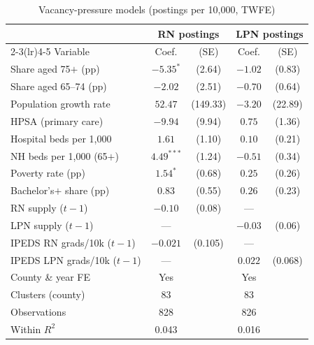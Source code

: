 \begin{table}[!htbp]
\centering
\caption{Vacancy-pressure models (postings per 10{,}000, TWFE)}
\label{tab:vacancy}
\small
\begin{tabular}{lcccc}
\toprule
 & \multicolumn{2}{c}{RN postings} & \multicolumn{2}{c}{LPN postings} \\
\cmidrule(lr){2-3}\cmidrule(lr){4-5}
Variable & Coef. & (SE) & Coef. & (SE) \\
\midrule
Share aged 75$+$ (pp) & $-5.35^{*}$ & (2.64) & $-1.02$ & (0.83) \\
Share aged 65--74 (pp) & $-2.02$ & (2.51) & $-0.70$ & (0.64) \\
Population growth rate & $52.47$ & (149.33) & $-3.20$ & (22.89) \\
HPSA (primary care) & $-9.94$ & (9.94) & $0.75$ & (1.36) \\
Hospital beds per 1{,}000 & $1.61$ & (1.10) & $0.10$ & (0.21) \\
NH beds per 1{,}000 (65$+$) & $4.49^{***}$ & (1.24) & $-0.51$ & (0.34) \\
Poverty rate (pp) & $1.54^{*}$ & (0.68) & $0.25$ & (0.26) \\
Bachelor's$+$ share (pp) & $0.83$ & (0.55) & $0.26$ & (0.23) \\
RN supply ($t-1$) & $-0.10$ & (0.08) & --- &  \\
LPN supply ($t-1$) & --- &  & $-0.03$ & (0.06) \\
IPEDS RN grads/10k ($t-1$) & $-0.021$ & (0.105) & --- &  \\
IPEDS LPN grads/10k ($t-1$) & --- &  & $0.022$ & (0.068) \\
\midrule
County \& year FE & Yes & & Yes & \\
Clusters (county) & 83 & & 83 & \\
Observations & 828 & & 826 & \\
Within $R^{2}$ & 0.043 & & 0.016 & \\
\bottomrule
\end{tabular}
\end{table}

